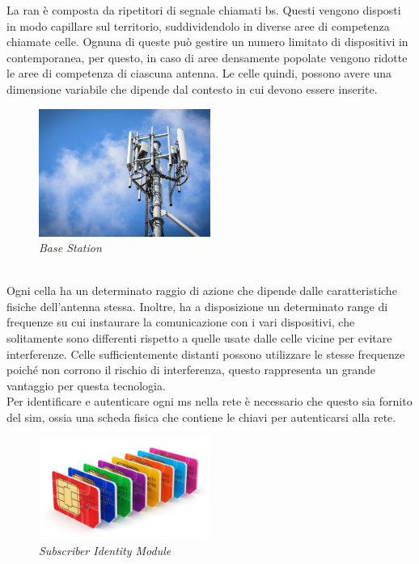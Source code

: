 \noindent La \gls{ran} è composta da ripetitori di segnale chiamati \gls{bs}. 
Questi vengono disposti in modo capillare sul territorio, suddividendolo in diverse aree di competenza chiamate celle. Ognuna di queste può gestire
un numero limitato di dispositivi in contemporanea, per questo, in caso di aree densamente popolate vengono 
ridotte le aree di competenza di ciascuna antenna. Le celle quindi, possono avere una dimensione variabile che dipende dal contesto in cui devono essere inserite.
\begin{figure}[h]
    \centering
    \includegraphics[width=0.5\textwidth]{images/base-station.jpg}
    \caption{\textit{Base Station}}
\end{figure}\\
Ogni cella ha un determinato raggio di azione che dipende dalle caratteristiche fisiche dell'antenna stessa. Inoltre, 
ha a disposizione un determinato range di frequenze su cui instaurare la comunicazione con i vari dispositivi, che solitamente
sono differenti rispetto a quelle usate dalle celle vicine per evitare interferenze.
Celle sufficientemente distanti possono utilizzare le stesse frequenze poiché non corrono il rischio di interferenza, questo rappresenta
un grande vantaggio per questa tecnologia.\\

\noindent Per identificare e autenticare ogni \gls{ms} nella rete è necessario che questo sia fornito del \gls{sim}, ossia una scheda fisica 
che contiene le chiavi per autenticarsi alla rete.
\begin{figure}[h]
    \centering
    \includegraphics[width=0.5\textwidth]{images/simcard.jpg}
    \caption{\textit{Subscriber Identity Module}}
\end{figure}


